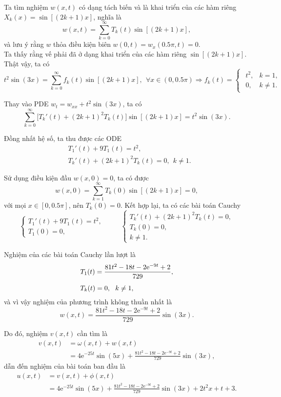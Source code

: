 \documentclass[10pt, a4paper]{article}
\begin{document}
	Ta tìm nghiệm $w(x,t)$ có dạng tách biến và là khai triển của các hàm riêng $X_k(x)=\sin[(2k+1)x]$, nghĩa là $$w(x,t)=\sum_{k=0}^\infty T_k(t)\sin[(2k+1)x],$$
	và lưu ý rằng $w$ thỏa điều kiện biên $w(0,t)=w_x(0.5\pi,t)=0$.\\
	
	Ta thấy rằng vế phải đã ở dạng khai triển của các hàm riêng $\sin[(2k+1)x]$. Thật vậy, ta có $$t^2\sin(3x)=\sum_{k=0}^\infty f_k(t)\sin[(2k+1)x],~~\forall x\in(0,0.5\pi)\Rightarrow f_k(t)=\begin{cases}
		\begin{array}{ll}
			t^2, & k=1, \\
			0, & k\ne1.
		\end{array}
	\end{cases}$$
	
	Thay vào PDE $w_t=w_{xx}+t^2\sin(3x)$, ta có $$\sum_{k=0}^\infty\big[T_k'(t)+(2k+1)^2T_k(t)\big]\sin[(2k+1)x]=t^2\sin(3x).$$
	
	Đồng nhất hệ số, ta thu được các ODE \begin{align*}
		&T_1'(t)+9T_1(t)=t^2,\\
		&T_k'(t)+(2k+1)^2T_k(t)=0,~~k\ne1.
	\end{align*}
	
	Sử dụng điều kiện đầu $w(x,0)=0$, ta có được $$w(x,0)=\displaystyle\sum_{k=1}^\infty T_k(0)\sin[(2k+1)x]=0,$$
	với mọi $x\in[0,0.5\pi]$, nên $T_k(0)=0$. Kết hợp lại, ta có các bài toán Cauchy $$\begin{cases}
		T_1'(t)+9T_1(t)=t^2,\\
		T_1(0)=0,
	\end{cases}\hspace{1cm}\begin{cases}
		T_k'(t)+(2k+1)^2T_k(t)=0,\\
		T_k(0)=0,\\
		k\ne1.
	\end{cases}$$
	
	Nghiệm của các bài toán Cauchy lần lượt là \begin{align*}
		&T_1(t)=\frac{81t^2-18t-2\mathrm e^{-9t}+2}{729},\\
		\noalign{\vskip5pt}
		&T_k(t)=0,~~k\ne1,
	\end{align*}
	và vì vậy nghiệm của phương trình không thuần nhất là $$w(x,t)=\frac{81t^2-18t-2\mathrm e^{-9t}+2}{729}\sin(3x).$$
	
	Do đó, nghiệm $v(x,t)$ cần tìm là \begin{align*}
		v(x,t)&=\omega(x,t)+w(x,t)\\
		&=4\mathrm e^{-25t}\sin(5x)+\frac{81t^2-18t-2\mathrm e^{-9t}+2}{729}\sin(3x),
	\end{align*}
	dẫn đến nghiệm của bài toán ban đầu là \begin{align*}
		u(x,t)&=v(x,t)+\phi(x,t)\\
		&=4\mathrm e^{-25t}\sin(5x)+\frac{81t^2-18t-2\mathrm e^{-9t}+2}{729}\sin(3x)+2t^2x+t+3.
	\end{align*}
	
\end{document}
